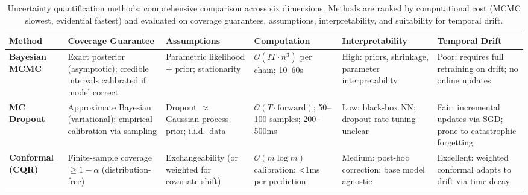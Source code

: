 
\begin{landscape}
\landscapepagestyle
\begin{table}[p]
  \centering
  \caption[Uncertainty quantification methods comparison]{Uncertainty quantification methods: comprehensive comparison across six dimensions. Methods are ranked by computational cost (MCMC slowest, evidential fastest) and evaluated on coverage guarantees, assumptions, interpretability, and suitability for temporal drift.}
  \label{tab:uq-comparison}
  \begin{threeparttable}
  \scriptsize
  \setlength{\tabcolsep}{3pt}
  \renewcommand{\arraystretch}{1.0}
  \begin{tabularx}{\linewidth}{@{} l X X X X X @{}}
    \toprule
    \textbf{Method} & \textbf{Coverage Guarantee} & \textbf{Assumptions} & \textbf{Computation} & \textbf{Interpretability} & \textbf{Temporal Drift} \\
    \midrule

    \textbf{Bayesian MCMC}
    & Exact posterior (asymptotic); credible intervals calibrated if model correct
    & Parametric likelihood + prior; stationarity
    & $\mathcal{O}(IT \cdot n^3)$\tnote{a} per chain; 10--60s
    & High: priors, shrinkage, parameter interpretability
    & Poor: requires full retraining on drift; no online updates \\

    \midrule

    \textbf{MC Dropout}
    & Approximate Bayesian (variational); empirical calibration via sampling
    & Dropout $\approx$ Gaussian process prior; i.i.d.\ data
    & $\mathcal{O}(T \cdot \text{forward})$; 50--100 samples; 200--500ms
    & Low: black-box NN; dropout rate tuning unclear
    & Fair: incremental updates via SGD; prone to catastrophic forgetting \\

    \midrule

    \textbf{Conformal (CQR)}
    & Finite-sample coverage $\ge 1-\alpha$ (distribution-free)
    & Exchangeability (or weighted for covariate shift)
    & $\mathcal{O}(m \log m)$\tnote{b} calibration; <1ms per prediction
    & Medium: post-hoc correction; base model agnostic
    & Excellent: weighted conformal adapts to drift via time decay \\

    \midrule


\end{tabularx}
\end{threeparttable}
\end{table}
\end{landscape}
